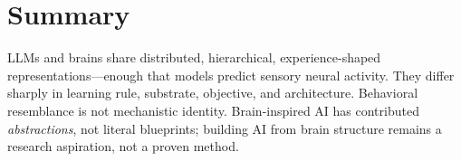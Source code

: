 \documentclass[11pt]{article}
\begin{document}
\section{Summary}
LLMs and brains share distributed, hierarchical, experience-shaped representations---enough that models
predict sensory neural activity. They differ sharply in learning rule, substrate, objective, and
architecture. Behavioral resemblance is not mechanistic identity. Brain-inspired AI has contributed
\emph{abstractions}, not literal blueprints; building AI from brain structure remains a research
aspiration, not a proven method.



\end{document}
